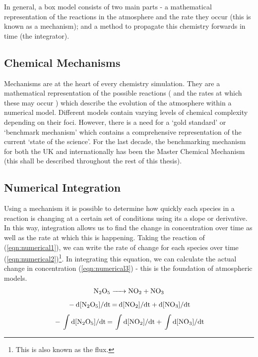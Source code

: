 In general, a box model consists of two main parts - a mathematical representation of the reactions in the atmosphere and the rate they occur (this is known as a mechanism); and a method to propagate this chemistry forwards in time (the integrator).



\subsection{Chemical Mechanisms}
Mechanisms are at the heart of every chemistry simulation. They are a mathematical representation of the possible reactions ( and the rates at which these may occur ) which describe the evolution of the atmosphere within a numerical model. Different models contain varying levels of chemical complexity depending on their foci. However, there is a need for a `gold standard' or `benchmark mechanism' which contains a comprehensive representation of the current `state of the science'. For the last decade, the benchmarking mechanism for both the UK and internationally has been the Master Chemical Mechanism \citep{mcm} (this shall be described throughout the rest of this thesis).


\subsection{Numerical Integration}
Using a mechanism it is possible to determine how quickly each species in a reaction is changing at a certain set of conditions using its a slope or derivative. In this way, integration allows us to find the change in concentration over time as well as the rate at which this is happening.  Taking the reaction of  (\autoref{eqn:numerical1}), we can write the rate of change for each species over time (\autoref{eqn:numerical2})\footnote{This is also known as the flux.}. In integrating this equation, we can calculate the actual change in concentration (\autoref{eqn:numerical3}) - this is the foundation of atmospheric models.
\begin{equation}
\ce{N2O5 ->    NO2} + \ce{NO3}
\label{eqn:numerical1}
\end{equation}
\begin{equation}
\ce{- d[N2O5]/dt =   d[NO2]/dt} + \ce{d[NO3]/dt}
\label{eqn:numerical2}
\end{equation}
\begin{equation}
\ce{ - \int d[N2O5]/dt =  \int d[NO2]/dt} + \ce{\int d[NO3]/dt}
\label{eqn:numerical3}
\end{equation}
